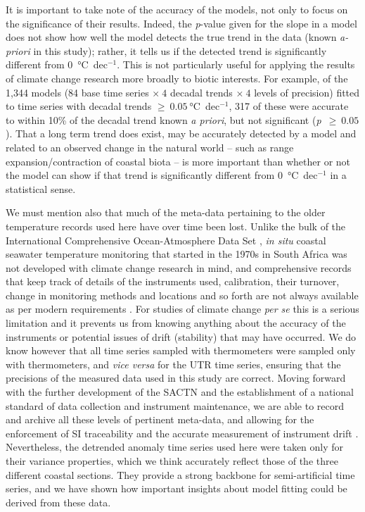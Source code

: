 \documentclass[twocol]{ametsoc}
\begin{document}
It is important to take note of the accuracy of the models, not only to focus on the significance of their results. Indeed, the \emph{p}-value given for the slope in a model does not show how well the model detects the true trend in the data (known \emph{a-priori} in this study); rather, it tells us if the detected trend is significantly different from \SI{0}{\degreeCelsius}~dec$^{-1}$. This is not particularly useful for applying the results of climate change research more broadly to biotic interests. For example, of the 1,344 models (84 base time series $\times~4$ decadal trends $\times~4$ levels of precision) fitted to time series with decadal trends $\geq~\SI{0.05}{\degreeCelsius}$~dec$^{-1}$, 317 of these  were accurate to within 10\% of the decadal trend known \emph{a priori}, but not significant (\emph{p}~$\geq~0.05$). That a long term trend does exist, may be accurately detected by a model and related to an observed change in the natural world -- such as range expansion/contraction of coastal biota \citep{Bolton2012,Straub2016,Wernberg2016} -- is more important than whether or not the model can show if that trend is significantly different from \SI{0}{\degreeCelsius}~dec$^{-1}$ in a statistical sense.

We must mention also that much of the meta-data pertaining to the older temperature records used here have over time been lost. Unlike the bulk of the International Comprehensive Ocean-Atmosphere Data Set \citep[ICOADS;][]{Freeman:2016db}, \emph{in situ} coastal seawater temperature monitoring that started in the 1970s in South Africa was not developed with climate change research in mind, and comprehensive records that keep track of details of the instruments used, calibration, their turnover, change in monitoring methods and locations and so forth are not always available as per modern requirements \citep{Aguilar2003}. For studies of climate change \emph{per se} this is a serious limitation and it prevents us from knowing anything about the accuracy of the instruments or potential issues of drift (stability) that may have occurred. We do know however that all time series sampled with thermometers were sampled only with thermometers, and \emph{vice versa} for the UTR time series, ensuring that the precisions of the measured data used in this study are correct. Moving forward with the further development of the SACTN and the establishment of a national standard of data collection and instrument maintenance, we are able to record and archive all these levels of pertinent meta-data, and allowing for the enforcement of SI traceability and the accurate measurement of instrument drift \citep{Jarraud2008}. Nevertheless, the detrended anomaly time series used here were taken only for their variance properties, which we think accurately reflect those of the three different coastal sections. They provide a strong backbone for semi-artificial time series, and we have shown how important insights about model fitting could be derived from these data.
\end{document}
